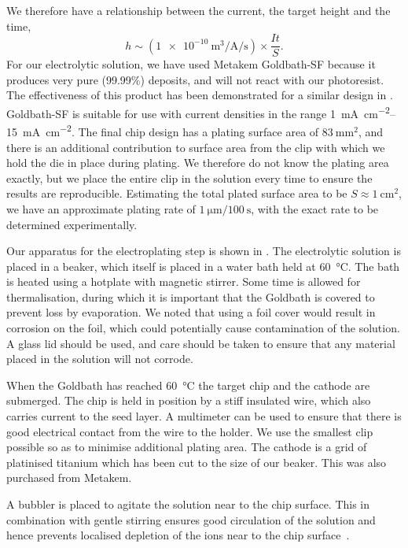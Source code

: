 We therefore have a relationship between the current, the target height and the
time,
%
\begin{equation}
  h \sim \left(
  \SI[per-mode=fraction]{1e-10}{\meter\cubed\per\ampere\per\second} \right)
  \times\frac{It}{S}.
\end{equation}
%
For our electrolytic solution, we have used Metakem Goldbath-SF because it
produces very pure (99.99\%) deposits, and will not react with our photoresist.
The effectiveness of this product has been demonstrated for a similar design in
.
%
Goldbath-SF is suitable for use with current densities in the range
\SIrange{1}{15}{\milli\ampere\per\centi\meter\squared}. The final chip design
has a plating surface area of $\SI{83}{\milli\meter\squared}$, and there is an
additional contribution to surface area from the clip with which we hold the
die in place during plating. We therefore do not know the plating area exactly,
but we place the entire clip in the solution every time to ensure the
results are reproducible. Estimating the total plated surface area to be
$S\approx\SI{1}{\centi\meter\squared}$, we have an approximate plating rate of
$\SI{1}{\micro\meter}/\SI{100}{\second}$, with the exact rate to be determined
experimentally.

Our apparatus for the electroplating step is shown in
. The electrolytic solution is placed in a
beaker, which itself is placed in a water bath held at \SI{60}{\celsius}. The
bath is heated using a hotplate with magnetic stirrer. Some time is allowed for
thermalisation, during which it is important that the Goldbath is covered to
prevent loss by evaporation. We noted that using a foil cover would result in
corrosion on the foil, which could potentially cause contamination of the
solution. A glass lid should be used, and care should be taken to ensure that
any material placed in the solution will not corrode.

When the Goldbath has reached \SI{60}{\celsius} the target chip and the cathode
are submerged. The chip is held in position by a stiff insulated wire, which
also carries current to the seed layer. A multimeter can be used to ensure that
there is good electrical contact from the wire to the holder. We use the
smallest clip possible so as to minimise additional plating area. The cathode
is a grid of platinised titanium which has been cut to the size of our beaker.
This was also purchased from Metakem.

A bubbler is placed to agitate the solution near to the chip surface. This in
combination with gentle stirring ensures good circulation of the solution and
hence prevents localised depletion of the ions near to the chip
surface~\cite{Schlesinger2011, SEtienne2020}. 

